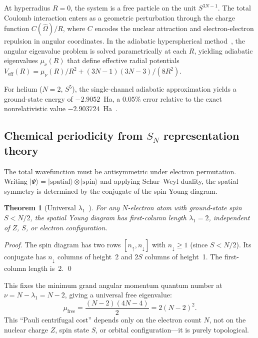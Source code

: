 \documentclass[aps,pra,twocolumn,superscriptaddress,longbibliography]{revtex4-2}
\newtheorem{theorem}{Theorem}
\begin{document}
At hyperradius $R = 0$, the system is a free particle on the unit
$S^{3N-1}$.  The total Coulomb interaction enters as a geometric
perturbation through the charge function $C(\hat{\Omega})/R$, where
$C$ encodes the nuclear attraction and electron-electron repulsion in
angular coordinates.  In the adiabatic hyperspherical
method~\cite{Macek1968,Lin1995}, the angular eigenvalue problem is
solved parametrically at each $R$, yielding adiabatic eigenvalues
$\mu_\nu(R)$ that define effective radial potentials
$V_{\text{eff}}(R) = \mu_\nu(R)/R^2 + (3N-1)(3N-3)/(8R^2)$.

For helium ($N = 2$, $S^5$), the single-channel adiabatic approximation
yields a ground-state energy of $-2.9052$~Ha, a 0.05\% error relative
to the exact nonrelativistic value $-2.903724$~Ha~\cite{Paper13}.

\subsection{Chemical periodicity from $S_N$ representation theory}

The total wavefunction must be antisymmetric under electron permutation.
Writing $|\Psi\rangle = |\text{spatial}\rangle \otimes |\text{spin}\rangle$
and applying Schur--Weyl duality, the spatial symmetry is determined by
the conjugate of the spin Young diagram.

\begin{theorem}[Universal $\lambda_1$~\cite{Paper16}]
For any $N$-electron atom with ground-state spin $S < N/2$, the spatial
Young diagram has first-column length $\lambda_1 = 2$, independent of
$Z$, $S$, or electron configuration.
\end{theorem}

\noindent\textit{Proof.}  The spin diagram has two rows
$[n_\uparrow, n_\downarrow]$ with $n_\downarrow \geq 1$ (since
$S < N/2$).  Its conjugate has $n_\downarrow$ columns of height~2 and
$2S$ columns of height~1.  The first-column length is~2.  \qed

This fixes the minimum grand angular momentum quantum number at
$\nu = N - \lambda_1 = N - 2$, giving a universal free eigenvalue:
\begin{equation}
\boxed{\mu_{\text{free}} = \frac{(N-2)(4N-4)}{2} = 2(N-2)^2.}
\label{eq:mu_free}
\end{equation}
This ``Pauli centrifugal cost'' depends only on the electron count $N$,
not on the nuclear charge $Z$, spin state $S$, or orbital
configuration---it is purely topological.
\end{document}
